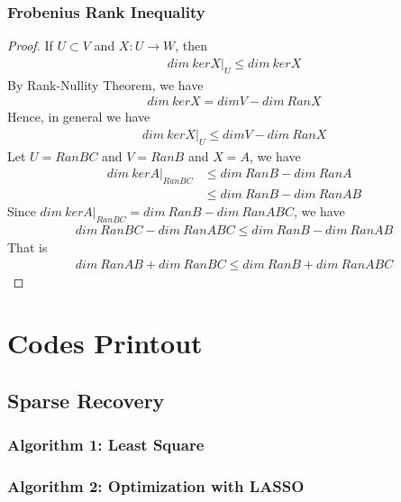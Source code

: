 \documentclass[11pt,a4paper]{report}
\begin{document}
\subsection{Frobenius Rank Inequality}
\begin{proof}
    If $U \subset V$ and $X: U \rightarrow W$, then
    \begin{align}
        dim\ ker X|_U \leq dim\ ker X
    \end{align}
    By Rank-Nullity Theorem, we have 
    \begin{align}
        dim\ ker X = dim V - dim\ Ran X
    \end{align}
    Hence, in general we have
    \begin{align}
        dim\ ker X|_U \leq dim V - dim\ Ran X
    \end{align}
    Let $U = Ran BC$ and $V = Ran B$ and $X = A$, we have
    \begin{align}
        dim\ ker A|_{Ran BC} &\leq dim\ Ran B - dim\ Ran A \\
                             &\leq dim\ Ran B - dim\ Ran AB
    \end{align}
    Since $dim\ ker A|_{Ran BC} = dim\ Ran B - dim\ Ran ABC$, we have
    \begin{align}
        dim\ Ran BC - dim\ Ran ABC \leq dim\ Ran B - dim\ Ran AB
    \end{align}
    That is 
    \begin{align}
       dim\ Ran AB + dim\ Ran BC  \leq dim\ Ran B + dim\ Ran ABC
    \end{align}

\end{proof}

\newpage
\appendix
\chapter{Codes Printout}

\section{Sparse Recovery}
\subsection{Algorithm 1: Least Square}

\newpage
\subsection{Algorithm 2: Optimization with LASSO}

\newpage
\end{document}
